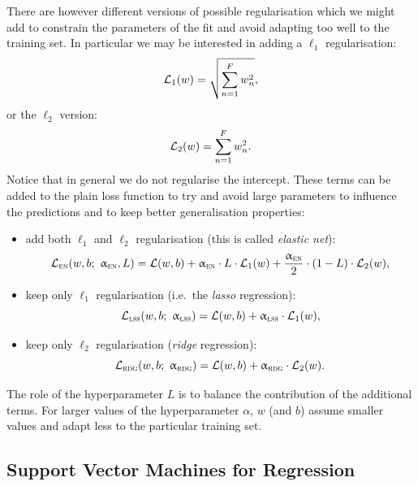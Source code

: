 There are however different versions of possible regularisation which we might add to constrain the parameters of the fit and avoid adapting too well to the training set.
In particular we may be interested in adding a $\ell_1$ regularisation:
\begin{equation}
  \mathcal{L}_1(w) = \sqrt{\sum\limits_{n = 1}^{F} w_n^2},
\end{equation}
or the $\ell_2$ version:
\begin{equation}
  \mathcal{L}_2(w) = \sum\limits_{n = 1}^{F} w_n^2.
\end{equation}
Notice that in general we do not regularise the intercept.
These terms can be added to the plain loss function to try and avoid large parameters to influence the predictions and to keep better generalisation properties:
\begin{itemize}
  \item add both $\ell_1$ and $\ell_2$ regularisation (this is called \emph{elastic net}):
    \begin{equation}
      \mathcal{L}_{\textsc{en}}(w, b;~\upalpha_{\textsc{en}}, L) = \mathcal{L}(w,b) + \upalpha_{\textsc{en}} \cdot L \cdot \mathcal{L}_1(w) + \frac{\upalpha_{\textsc{en}}}{2} \cdot (1 - L) \cdot \mathcal{L}_2(w),
    \end{equation}

  \item keep only $\ell_1$ regularisation (i.e.\ the \emph{lasso} regression):
    \begin{equation}
      \mathcal{L}_{\textsc{lss}}(w, b;~\upalpha_{\textsc{lss}}) = \mathcal{L}(w,b) + \upalpha_{\textsc{lss}} \cdot \mathcal{L}_1(w),
    \end{equation}

  \item keep only $\ell_2$ regularisation (\emph{ridge} regression):
    \begin{equation}
      \mathcal{L}_{\textsc{rdg}}(w, b;~\upalpha_{\textsc{rdg}}) = \mathcal{L}(w,b) + \upalpha_{\textsc{rdg}} \cdot \mathcal{L}_2(w).
      \label{eq:ridge:loss}
    \end{equation}
\end{itemize}
The role of the hyperparameter $L$ is to balance the contribution of the additional terms.
For larger values of the hyperparameter $\alpha$, $w$ (and $b$) assume smaller values and adapt less to the particular training set.


\subsection{Support Vector Machines for Regression}
\label{sec:app:svr}

